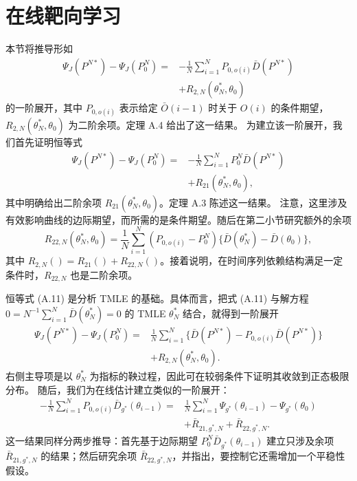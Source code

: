 
\section{在线靶向学习}

本节将推导形如
\begin{equation}
\begin{aligned}
\Psi_J(P^{N*})-\Psi_J(P_0^N)
={}&-\frac1N\sum_{i=1}^NP_{0,o(i)}\bar D(P^{N*})\\
&+R_{2,N}(\theta_N^*,\theta_0)
\end{aligned}
\tag{A.11}
\end{equation}
的一阶展开，其中 $P_{0,o(i)}$ 表示给定 $\bar O(i-1)$ 时关于 $O(i)$ 的条件期望，
$R_{2,N}(\theta_N^*,\theta_0)$ 为二阶余项。定理 A.4 给出了这一结果。
为建立该一阶展开，我们首先证明恒等式
\[
\begin{aligned}
\Psi_J(P^{N*})-\Psi_J(P_0^N)
={}&-\frac1N\sum_{i=1}^NP_0^N\bar D(P^{N*})\\
&+R_{21}(\theta_N^*,\theta_0),
\end{aligned}
\]
其中明确给出二阶余项 $R_{21}(\theta_N^*,\theta_0)$。定理 A.3 陈述这一结果。
注意，这里涉及有效影响曲线的边际期望，而所需的是条件期望。随后在第二小节研究额外的余项
\[
R_{22,N}(\theta_N^*,\theta_0)
 =\frac1N\sum_{i=1}^N(P_{0,o(i)}-P_0^N)
 \{\bar D(\theta_N^*)-\bar D(\theta_0)\},
\]
其中 $R_{2,N}()=R_{21}()+R_{22,N}()$。接着说明，在时间序列依赖结构满足一定条件时，$R_{22,N}$ 也是二阶余项。

恒等式 (A.11) 是分析 TMLE 的基础。具体而言，把式 (A.11) 与解方程
$0=N^{-1}\sum_{i=1}^N\bar D(\theta_N^*)=0$ 的 TMLE $\theta_N^*$ 结合，就得到一阶展开
\[
\begin{aligned}
\Psi_J(P^{N*})-\Psi_J(P_0^N)
={}&\frac1N\sum_{i=1}^N\{\bar D(P^{N*})-P_{0,o(i)}\bar D(P^{N*})\}\\
&+R_{2,N}(\theta_N^*,\theta_0).
\end{aligned}
\]
右侧主导项是以 $\theta_N^*$ 为指标的鞅过程，因此可在较弱条件下证明其收敛到正态极限分布。
随后，我们为在线估计建立类似的一阶展开：
\[
\begin{aligned}
-\frac1N\sum_{i=1}^NP_{0,o(i)}\bar D_{g^*}(\theta_{i-1})
={}&\frac1N\sum_{i=1}^N\Psi_{g^*}(\theta_{i-1})-\Psi_{g^*}(\theta_0)\\
&+\bar R_{21,g^*,N}+\bar R_{22,g^*,N}.
\end{aligned}
\]
这一结果同样分两步推导：首先基于边际期望 $P_0^N\bar D_{g^*}(\theta_{i-1})$ 建立只涉及余项 $\bar R_{21,g^*,N}$ 的结果；然后研究余项 $\bar R_{22,g^*,N}$，并指出，要控制它还需增加一个平稳性假设。

